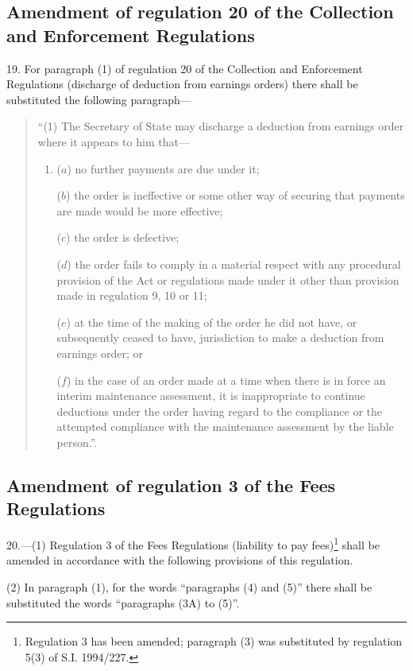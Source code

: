 \documentclass[12pt,a4paper]{article}
\begin{document}
\subsection[19. Amendment of regulation 20 of the Collection and Enforcement Regulations]{Amendment of regulation 20 of the Collection and Enforcement Regulations}

19.  For paragraph (1) of regulation 20 of the Collection and Enforcement Regulations (discharge of deduction from earnings orders) there shall be substituted the following paragraph—
\begin{quotation}
“(1) The Secretary of State may discharge a deduction from earnings order where it appears to him that—
\begin{enumerate}\item[]
($a$) no further payments are due under it;

($b$) the order is ineffective or some other way of securing that payments are made would be more effective;

($c$) the order is defective;

($d$) the order fails to comply in a material respect with any procedural provision of the Act or regulations made under it other than provision made in regulation 9, 10 or 11;

($e$) at the time of the making of the order he did not have, or subsequently ceased to have, jurisdiction to make a deduction from earnings order; or

($f$) in the case of an order made at a time when there is in force an interim maintenance assessment, it is inappropriate to continue deductions under the order having regard to the compliance or the attempted compliance with the maintenance assessment by the liable person.”.
\end{enumerate}
\end{quotation}

\subsection[20. Amendment of regulation 3 of the Fees Regulations]{Amendment of regulation 3 of the Fees Regulations}

20.—(1) Regulation 3 of the Fees Regulations (liability to pay fees)\footnote{\frenchspacing Regulation 3 has been amended; paragraph (3) was substituted by regulation 5(3) of S.I. 1994/227.} shall be amended in accordance with the following provisions of this regulation.

(2) In paragraph (1), for the words “paragraphs (4) and (5)” there shall be substituted the words “paragraphs (3A) to (5)”.
\end{document}
